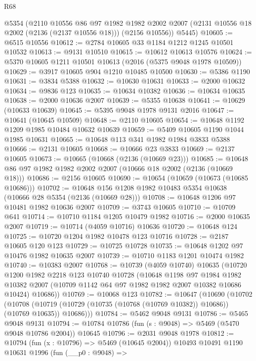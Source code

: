 \begin{lexlean}{R68}
\begin{coremodule}
      @5354
      (@2110
        @10556
        @86
        @97
        @1982
        @1982
        @2002
        @2007
        (@2131 @10556 @18 @2002 (@2136 (@2137 @10556 @18)))
        (@2156 @10556))
      @5445)
@10605 := @6515 @10556
@10612 := @2784 @10605 @33 @1184 @1212 @1245 @10501 @10532
@10613 := @9131 @10510
@10615 := @10612 @10613 @10576
@10624 := @5370 @10605 @1211 @10501 @10613 (@2016 (@5375 @9048 @1978 @10509))
@10629 := @3917 @10605 @904 @1210 @10485 @10500
@10630 := @5386 @1190
@10631 := @3834 @5388
@10632 := @10630 @10631
@10633 := @2000 @10632
@10634 := @9836 @123
@10635 := @10634 @10382
@10636 := @10634 @10635
@10638 := @2000 @10636 @2007
@10639 := @5355 @10638
@10641 := @10629 (@10633 @10639)
@10645 := @5395 @9048 @1978 @9131 @2016
@10647 := @10641 (@10645 @10509)
@10648 := @2110 @10605
@10654 := @10648 @1192 @1209 @1985 @10484 @10632 @10639
@10659 := @5409 @10605 @1190 @1044 @1985 @10631
@10665 := @10648 @113 @341 @1982 @1984 @3833 @5388
@10666 := @2131 @10605
@10668 := @10666 @23 @3833
@10669 := @2137 @10605
@10673 := @10665 (@10668 (@2136 (@10669 @23)))
@10685 := @10648 @86 @97 @1982 @1982 @2002 @2007 (@10666 @18 @2002 (@2136 (@10669 @18)))
@10686 := @2156 @10605
@10690 := @10654 (@10659 (@10673 (@10685 @10686)))
@10702 := @10648 @156 @1208 @1982 @10483 @5354 @10638 (@10666 @28 @5354 (@2136 (@10669 @28)))
@10708 := @10648 @1206 @97 @10481 @1982 @10636 @2007
@10709 := @3743 @10605
@10710 := @10709 @641
@10714 := @10710 @1184 @1205 @10479 @1982
@10716 := @2000 @10635 @2007
@10719 := @10714 (@4059 @10716) @10636
@10720 := @10648 @124
@10725 := @10720 @1204 @1982 @10478 @123 @10716
@10728 := @2187 @10605 @120 @123
@10729 := @10725 @10728
@10735 := @10648 @1202 @97 @10476 @1982 @10635 @2007
@10739 := @10710 @1183 @1201 @10474 @1982
@10740 := @10383 @2007
@10768 := @10739
    (@4059 @10740)
    @10635
    (@10720
      @1200
      @1982
      @2218
      @123
      @10740
      @10728
      (@10648
        @1198
        @97
        @1984
        @1982
        @10382
        @2007
        (@10709 @1142 @64 @97 @1982 @1982 @2007 @10382 @10686 @10424)
        @10686))
@10769 := @10068 @123
@10782 := @10647
    (@10690
      (@10702
        (@10708 (@10719 (@10729 (@10735 (@10768 (@10769 @10382)) @10686)) (@10769 @10635)) @10686)))
@10784 := @5462 @9048 @9131
@10786 := @5465 @9048 @9131
@10794 := @10784 @10786 (fun (s : @9048) => @5469 (@5470 @9048 @10786 @2004)) @10645
@10796 := @2031 @9048 @1978
@10812 := @10794
    (fun (x : @10796) => @5469 (@10645 @2004))
    @10493
    @10491
    @1190
    @10631
    @1996
    (fun (__p0 : @9048) =>

\end{coremodule}
\end{lexlean}
